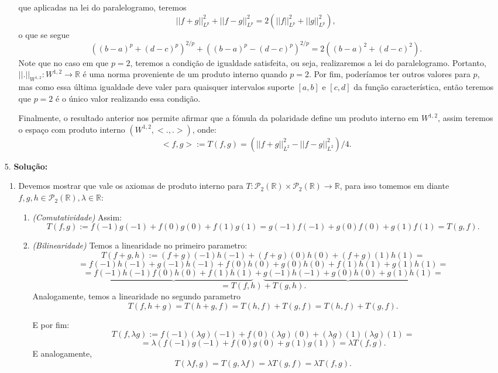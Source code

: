 \documentclass{article}
\begin{document}
\begin{enumerate}
\begin{enumerate}
				que aplicadas na lei do paralelogramo, teremos
				$$
				||f +g||_{L^{p}}^{2}+||f -g||_{L^{p}}^{2} =2(||f||_{L^{p}}^{2}+||g||_{L^{p}}^{2}),
				$$
				o que se segue
				$$
				((b-a)^{p}+(d-c)^{p})^{2/p}+((b-a)^{p}-(d-c)^{p})^{2/p} = 2((b-a)^{2}+(d-c)^{2}).
				$$
				Note que no caso em que $p=2$, teremos a condição de igualdade satisfeita, ou seja, realizaremos a lei do paralelogramo. Portanto, $||. ||_{W^{1,2}} : W^{1,2} \to \mathbb{R}$ é uma norma proveniente de um produto interno quando $p=2$. Por fim, poderíamos ter outros valores para $p$, mas como essa última igualdade deve valer para quaisquer intervalos suporte $[a, b]$ e $[c,d]$ da função característica, então teremos que $p=2$ é o único valor realizando essa condição.
				
				Finalmente, o resultado anterior nos permite afirmar que a fómula da polaridade define um produto interno em $W^{1,2}$, assim teremos o espaço com produto interno $(W^{1,2}, <.,.>)$, onde:
				$$
				<f,g> := T(f,g) = (||f +g||_{L^{2}}^{2} - ||f -g||_{L^{2}}^{2})/4.
				$$
			\end{enumerate}
		
		\item[5.] \textbf{Solução:}
			\begin{enumerate}
				\item Devemos mostrar que vale os axiomas de produto interno para $T: \mathcal{P}_{2}(\mathbb{R}) \times \mathcal{P}_{2}(\mathbb{R}) \to \mathbb{R}$, para isso tomemos em diante $f,g,h \in \mathcal{P}_{2}(\mathbb{R}), \lambda \in \mathbb{R}$:
					\begin{enumerate}
						\item \textit{(Comutatividade)} Assim: 
						$$
						T(f, g):= f(-1)g(-1) + f(0)g(0) + f(1)g(1) = g(-1)f(-1) + g(0)f(0) + g(1)f(1) = T(g, f).
						$$
						
						\item \textit{(Bilinearidade)} Temos a linearidade no primeiro parametro: 
						$$
						T(f+g, h) := (f+g)(-1)h(-1) +(f+g)(0)h(0)+(f+g)(1)h(1) =  
						$$
						$$
						= f(-1)h(-1)+g(-1)h(-1) +f(0)h(0)+g(0)h(0)+f(1)h(1)+g(1)h(1)=
						$$ 
						$$
						= \underbrace{f(-1)h(-1)f(0)h(0)+f(1)h(1)}+\underbrace{g(-1)h(-1) +g(0)h(0)+g(1)h(1)}=
						$$
						$$
						= T(f, h) + T(g,h).
						$$
						Analogamente, temos a linearidade no segundo parametro 
						$$
						T(f, h+g) = T(h+g, f) = T(h, f) + T(g, f) = T(h, f) + T(g, f).
						$$
						
						E por fim:
						$$
						T(f, \lambda g):= f(-1)(\lambda g)(-1) + f(0)(\lambda g)(0) + (\lambda g)(1)(\lambda g)(1) =
						$$
						$$
						=\lambda (f(-1)g(-1) + f(0)g(0) + g(1)g(1)) = \lambda T(f, g).
						$$
						E analogamente, 
						$$
						T(\lambda f, g) = T(g, \lambda f) = \lambda T(g,f) = \lambda T(f,g).
						$$
						

\end{enumerate}
\end{enumerate}
\end{enumerate}
\end{document}
